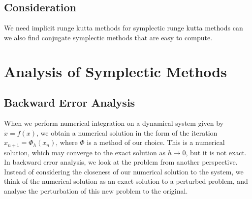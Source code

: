 \documentclass{report}
\theoremstyle{exampstyle} \newtheorem{example}[theorem]{Example}
\theoremstyle{exampstyle} \newtheorem{remark}[theorem]{Remark}
\theoremstyle{exampstyle} \newtheorem{definition}[theorem]{Definition}
\theoremstyle{exampstyle} \newtheorem{lemma}[theorem]{Lemma}
\theoremstyle{exampstyle} \newtheorem{proposition}[theorem]{Proposition}
\begin{document}
\subsection{Consideration}

We need implicit runge kutta methods for symplectic runge kutta methods
can we also find conjugate symplectic methods that are easy to compute.


\section{Analysis of Symplectic Methods}

\subsection{Backward Error Analysis}

When we perform numerical integration on a dynamical system given by $\dot{x} = f(x)$,
we obtain a numerical solution in the form of the iteration $x_{n+1} = \Phi_h(x_n)$,
where $\Phi$ is a method of our choice.
This is a numerical solution, which may converge to the exact solution as $h \rightarrow 0$,
but it is not exact.
In backward error analysis, we look at the problem from another perspective.
Instead of considering the closeness of our numerical solution to the system,
we think of the numerical solution as an exact solution to a perturbed problem,
and analyse the perturbation of this new problem to the original.
\end{document}
